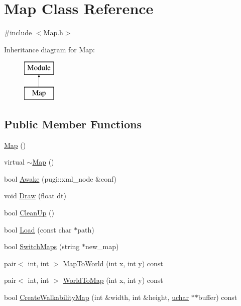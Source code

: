\hypertarget{class_map}{}\section{Map Class Reference}
\label{class_map}


{\ttfamily \#include $<$Map.\+h$>$}

Inheritance diagram for Map\+:\begin{figure}[H]
\begin{center}
\leavevmode
\includegraphics[height=2.000000cm]{class_map}
\end{center}
\end{figure}
\subsection*{Public Member Functions}
\begin{DoxyCompactItemize}
\item 
\mbox{\hyperlink{class_map_a0f5ad0fd4563497b4214038cbca8b582}{Map}} ()
\item 
virtual \mbox{\hyperlink{class_map_aa403fbe09394ccf39747588f5168e3b2}{$\sim$\+Map}} ()
\item 
bool \mbox{\hyperlink{class_map_a6b7219ea01063fe83b7fa13e196a17cd}{Awake}} (pugi\+::xml\+\_\+node \&conf)
\item 
void \mbox{\hyperlink{class_map_acdc0e71bae7daf3276b81249f273122c}{Draw}} (float dt)
\item 
bool \mbox{\hyperlink{class_map_acc2cb08f31839bf0545d7b47100b3884}{Clean\+Up}} ()
\item 
bool \mbox{\hyperlink{class_map_a3fcd66c685b1cc8a33097fd06ccbfad9}{Load}} (const char $\ast$path)
\item 
bool \mbox{\hyperlink{class_map_a87d365ff3aa0fe1f9683879f6f089812}{Switch\+Maps}} (string $\ast$new\+\_\+map)
\item 
pair$<$ int, int $>$ \mbox{\hyperlink{class_map_a178908c6cbd28edff73b363707c21482}{Map\+To\+World}} (int x, int y) const
\item 
pair$<$ int, int $>$ \mbox{\hyperlink{class_map_a5029898cd2fb95823117428b6f02ddd4}{World\+To\+Map}} (int x, int y) const
\item 
bool \mbox{\hyperlink{class_map_aa93a87c24c2bac810c7b2c63a6c32000}{Create\+Walkability\+Map}} (int \&width, int \&height, \mbox{\hyperlink{_defs_8h_a65f85814a8290f9797005d3b28e7e5fc}{uchar}} $\ast$$\ast$buffer) const
\end{DoxyCompactItemize}
